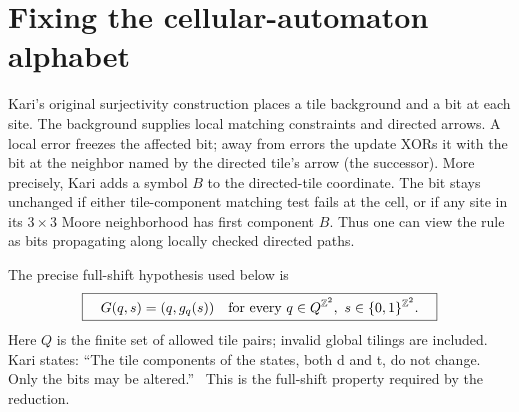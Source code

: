 \section{Fixing the cellular-automaton alphabet}\label{sec:fixed}

Kari's original surjectivity construction \cite[Theorem 2, p.~179]{Kari} places a tile background and a bit at each site. The background supplies local matching constraints and directed arrows. A local error freezes the affected bit; away from errors the update XORs it with the bit at the neighbor named by the directed tile's arrow (the successor). More precisely, Kari adds a symbol $B$ to the directed-tile coordinate. The bit stays unchanged if either tile-component matching test fails at the cell, or if any site in its $3\times3$ Moore neighborhood has first component $B$. Thus one can view the rule as bits propagating along locally checked directed paths.

The precise full-shift hypothesis used below is
\[
 \boxed{\quad G(q,s)=(q,g_q(s))
 \quad\text{for every }q\in Q^{\mathbb Z^2},\ s\in\{0,1\}^{\mathbb Z^2}.\quad}
\]
Here $Q$ is the finite set of allowed tile pairs; invalid global tilings are included. Kari states: \textquotedblleft The tile components of the states, both d and t, do not change. Only the bits may be altered.\textquotedblright\ \cite[p.~179]{Kari} This is the full-shift property required by the reduction.

